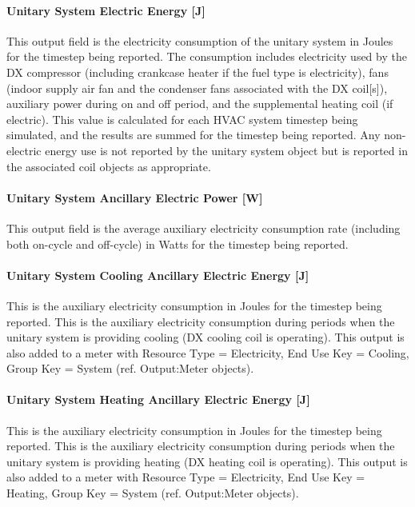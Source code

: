 \paragraph{Unitary System Electric Energy {[}J{]}}\label{unitary-system-electric-energy-j}

This output field is the electricity consumption of the unitary system in Joules for the timestep being reported. The consumption includes electricity used by the DX compressor (including crankcase heater if the fuel type is electricity), fans (indoor supply air fan and the condenser fans associated with the DX coil{[}s{]}), auxiliary power during on and off period, and the supplemental heating coil (if electric). This value is calculated for each HVAC system timestep being simulated, and the results are summed for the timestep being reported. Any non-electric energy use is not reported by the unitary system object but is reported in the associated coil objects as appropriate.

\paragraph{Unitary System Ancillary Electric Power {[}W{]}}\label{unitary-system-ancillary-electric-power-w}

This output field is the average auxiliary electricity consumption rate (including both on-cycle and off-cycle) in Watts for the timestep being reported.

\paragraph{Unitary System Cooling Ancillary Electric Energy {[}J{]}}\label{unitary-system-cooling-ancillary-electric-energy-j}

This is the auxiliary electricity consumption in Joules for the timestep being reported. This is the auxiliary electricity consumption during periods when the unitary system is providing cooling (DX cooling coil is operating). This output is also added to a meter with Resource Type = Electricity, End Use Key = Cooling, Group Key = System (ref. Output:Meter objects).

\paragraph{Unitary System Heating Ancillary Electric Energy {[}J{]}}\label{unitary-system-heating-ancillary-electric-energy-j}

This is the auxiliary electricity consumption in Joules for the timestep being reported. This is the auxiliary electricity consumption during periods when the unitary system is providing heating (DX heating coil is operating). This output is also added to a meter with Resource Type = Electricity, End Use Key = Heating, Group Key = System (ref. Output:Meter objects).

